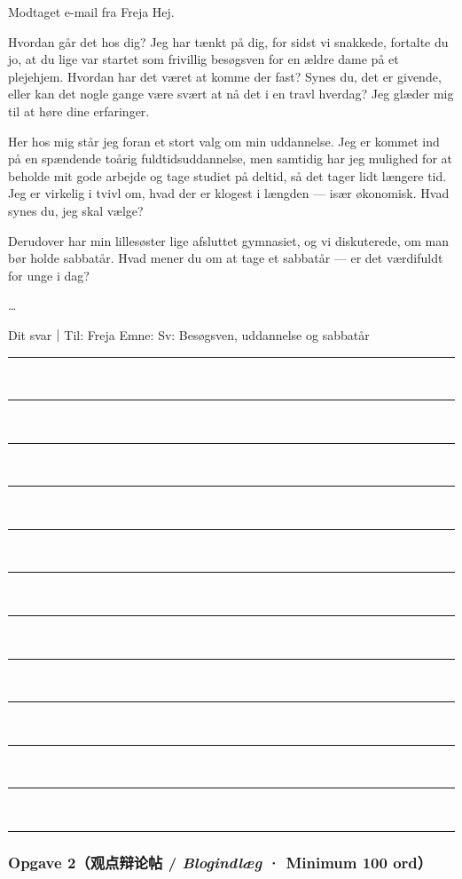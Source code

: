 \begin{emailbox}{Modtaget e-mail fra Freja}
Hej.

\vspace{0.12em}
Hvordan går det hos dig? Jeg har tænkt på dig, for sidst vi snakkede, fortalte du jo, at du lige var startet som frivillig besøgsven for en ældre dame på et plejehjem. Hvordan har det været at komme der fast? Synes du, det er givende, eller kan det nogle gange være svært at nå det i en travl hverdag? Jeg glæder mig til at høre dine erfaringer.

\vspace{0.12em}
Her hos mig står jeg foran et stort valg om min uddannelse. Jeg er kommet ind på en spændende toårig fuldtidsuddannelse, men samtidig har jeg mulighed for at beholde mit gode arbejde og tage studiet på deltid, så det tager lidt længere tid. Jeg er virkelig i tvivl om, hvad der er klogest i længden --- især økonomisk. Hvad synes du, jeg skal vælge?

\vspace{0.12em}
Derudover har min lillesøster lige afsluttet gymnasiet, og vi diskuterede, om man bør holde sabbatår. Hvad mener du om at tage et sabbatår --- er det værdifuldt for unge i dag?

\vspace{0.12em}
\ldots
\end{emailbox}

\begin{emailbox}{Dit svar｜Til: Freja \qquad Emne: Sv: Besøgsven, uddannelse og sabbatår}
\vspace{0.3em}
\rule{\linewidth}{0.4pt}\\[0.55em]
\rule{\linewidth}{0.4pt}\\[0.55em]
\rule{\linewidth}{0.4pt}\\[0.55em]
\rule{\linewidth}{0.4pt}\\[0.55em]
\rule{\linewidth}{0.4pt}\\[0.55em]
\rule{\linewidth}{0.4pt}\\[0.55em]
\rule{\linewidth}{0.4pt}\\[0.55em]
\rule{\linewidth}{0.4pt}\\[0.55em]
\rule{\linewidth}{0.4pt}\\[0.55em]
\rule{\linewidth}{0.4pt}\\[0.55em]
\rule{\linewidth}{0.4pt}\\[0.55em]
\rule{\linewidth}{0.4pt}
\end{emailbox}

\subsubsection*{Opgave 2（观点辩论帖 / \textit{Blogindlæg} · Minimum 100 ord）}


